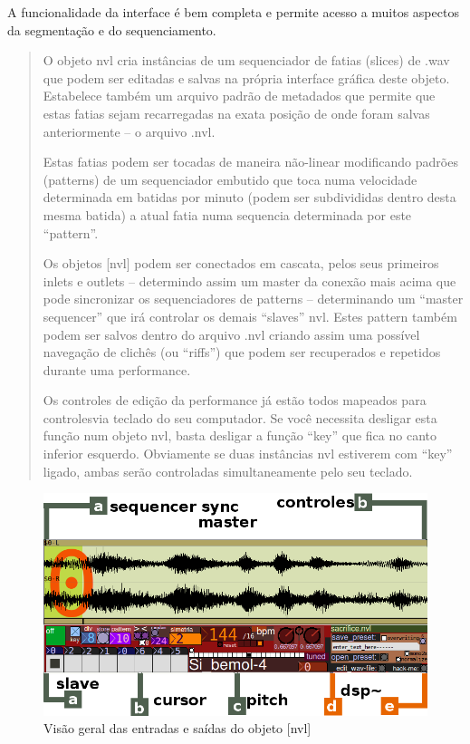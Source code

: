 \documentclass{ppgmus}
\begin{document}
A funcionalidade da interface é bem completa e permite acesso a muitos aspectos da segmentação e do
sequenciamento.

\begin{quote}
 O objeto nvl cria instâncias de um sequenciador de fatias (slices) de .wav que podem ser editadas e salvas na 
própria interface gráfica deste objeto.
Estabelece também um arquivo padrão de metadados que permite que estas fatias sejam recarregadas na 
exata posição de onde foram salvas anteriormente – o arquivo .nvl.

Estas fatias podem ser tocadas de maneira não-linear modificando padrões (patterns) de um sequenciador 
embutido que toca numa velocidade determinada em batidas por minuto (podem ser subdivididas dentro desta 
mesma batida) a atual fatia numa sequencia determinada por este “pattern”.

Os objetos [nvl] podem ser conectados em cascata, pelos seus primeiros inlets e outlets – determindo 
assim um master da conexão mais acima que pode sincronizar os sequenciadores de patterns – determinando um 
“master sequencer” que irá controlar os demais “slaves” nvl.
Estes pattern também podem ser salvos dentro do arquivo .nvl criando assim uma possível navegação de clichês 
(ou “riffs”) que podem ser recuperados e repetidos durante uma performance.

Os controles de edição da performance já estão todos mapeados para controlesvia teclado do seu computador. 
Se você necessita desligar esta função num objeto nvl, basta desligar a função “key” que fica no canto inferior 
esquerdo. Obviamente se duas instâncias nvl estiverem com “key” ligado, ambas serão controladas simultaneamente 
pelo seu teclado. \cite{navalha}
\end{quote} 

\begin{figure}
\includegraphics[scale=.6]{nvl1}
\caption{Visão geral das entradas e saídas do objeto [nvl]}
\label{nvl1}
\end{figure}
\end{document}
